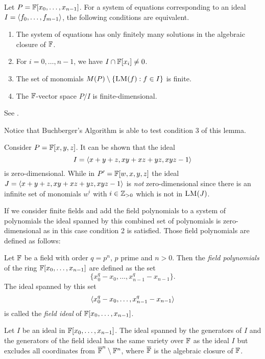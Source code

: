 \begin{lemma} 
Let $P = \mathbb{F}[x_0 ,\dots , x_{n-1}]$. For a system of equations corresponding to an ideal $I = \langle {f_0 , \dots, f_{m-1}} \rangle$, the following conditions are equivalent.
\begin{enumerate}
\item The system of equations has only finitely many solutions in the algebraic closure of $\mathbb{F}$.
\item For $i = 0, \dots, n-1$, we have $I \cap \mathbb{F}[x_i] \not= 0$.
\item The set of monomials $M(P) \setminus \{\textsc{LM}(f) : f \in I\}$ is finite.
\item The $\mathbb{F}$-vector space $P/I$ is finite-dimensional.
\end{enumerate}
\end{lemma}

\begin{citeproof}
See \cite[p.243ff]{Kreuzer2000}.
\end{citeproof}

Notice that Buchberger's Algorithm is able to test condition 3 of this lemma.

\begin{example}
Consider $P=\mathbb{F}[x,y,z]$. It can be shown that the ideal \[I = \langle {x + y + z, xy + xz + yz, xyz -1} \rangle\] is zero-dimensional. While in $P'=\mathbb{F}[w,x,y,z]$ the ideal $J = \langle {x + y + z, xy + xz + yz, xyz -1} \rangle$ is \emph{not} zero-dimensional since there is an infinite set of monomials $w^i$ with $i \in \mathbb{Z}_{>0}$ which is not in $\textsc{LM}(J)$.
\end{example}

If we consider finite fields and add the field polynomials to a system of polynomials the ideal spanned by this combined set of polynomials is zero-dimensional as in this case condition 2 is satisfied. Those field polynomials are defined as follows:

\begin{definition}
Let $\mathbb{F}$ be a field with order $q = p^n$, $p$ prime and $n > 0$. Then the \emph{field polynomials} of the ring $\mathbb{F}[x_0,\dots,x_{n-1}]$ are defined as the set \[ \{x_0^q - x_0, \dots , x_{n-1}^q - x_{n-1} \}. \] The ideal spanned by this set  \[ \langle { x_0^q - x_0, \dots , x_{n-1}^q - x_{n-1}} \rangle \] is called the \emph{field ideal} of $\mathbb{F}[x_0,\dots,x_{n-1}] $.
\end{definition}

\begin{corollary}
Let $I$ be an ideal in $\mathbb{F}[x_0,\dots,x_{n-1}]$. The ideal spanned by the generators of $I$ and the generators of the field ideal has the same variety
over $\mathbb{F}$ as the ideal $I$ but excludes all coordinates from $\overline{\mathbb{F}}^n \setminus \mathbb{F}^n$, where $\overline{\mathbb{F}}$ is the algebraic closure of $\mathbb{F}$.
\end{corollary}

